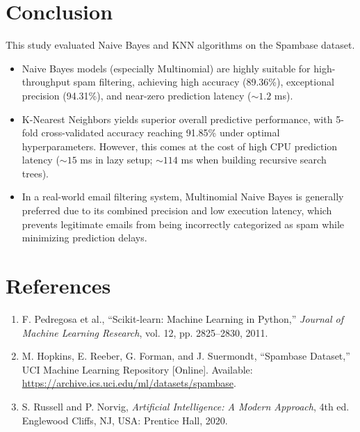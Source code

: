 \documentclass[12pt,a4paper]{article}
\begin{document}
\section{Conclusion}
This study evaluated Naive Bayes and KNN algorithms on the Spambase dataset. 
\begin{itemize}
    \item Naive Bayes models (especially Multinomial) are highly suitable for high-throughput spam filtering, achieving high accuracy (89.36\%), exceptional precision (94.31\%), and near-zero prediction latency ($\sim 1.2$ ms).
    \item K-Nearest Neighbors yields superior overall predictive performance, with 5-fold cross-validated accuracy reaching 91.85\% under optimal hyperparameters. However, this comes at the cost of high CPU prediction latency ($\sim 15$ ms in lazy setup; $\sim 114$ ms when building recursive search trees).
    \item In a real-world email filtering system, Multinomial Naive Bayes is generally preferred due to its combined precision and low execution latency, which prevents legitimate emails from being incorrectly categorized as spam while minimizing prediction delays.
\end{itemize}

\section{References}
\begin{enumerate}
    \item F. Pedregosa et al., ``Scikit-learn: Machine Learning in Python,'' \textit{Journal of Machine Learning Research}, vol. 12, pp. 2825--2830, 2011.
    \item M. Hopkins, E. Reeber, G. Forman, and J. Suermondt, ``Spambase Dataset,'' UCI Machine Learning Repository [Online]. Available: \url{https://archive.ics.uci.edu/ml/datasets/spambase}.
    \item S. Russell and P. Norvig, \textit{Artificial Intelligence: A Modern Approach}, 4th ed. Englewood Cliffs, NJ, USA: Prentice Hall, 2020.
\end{enumerate}
\end{document}
